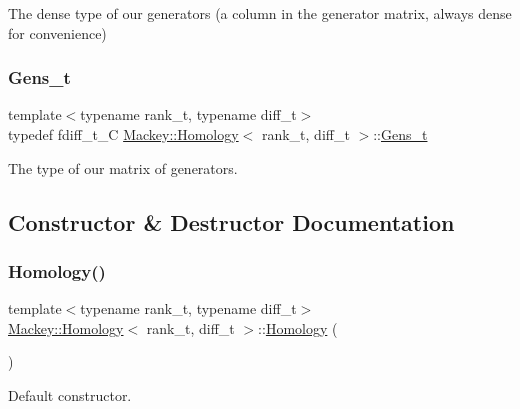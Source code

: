 The dense type of our generators (a column in the generator matrix, always dense for convenience) 

\mbox{\label{classMackey_1_1Homology_a986c3a6644aa52dc8279a26ade42fd64}} 
\subsubsection{\texorpdfstring{Gens\+\_\+t}{Gens\_t}}
{\footnotesize\ttfamily template$<$typename rank\+\_\+t, typename diff\+\_\+t$>$ \\
typedef fdiff\+\_\+t\+\_\+C \hyperlink{classMackey_1_1Homology}{Mackey\+::\+Homology}$<$ rank\+\_\+t, diff\+\_\+t $>$\+::\hyperlink{classMackey_1_1Homology_a986c3a6644aa52dc8279a26ade42fd64}{Gens\+\_\+t}}



The type of our matrix of generators. 



\subsection{Constructor \& Destructor Documentation}
\mbox{\label{classMackey_1_1Homology_a3580b194f986bd59a02fb84db97e00f2}} 
\subsubsection{\texorpdfstring{Homology()}{Homology()}\hspace{0.1cm}{\footnotesize\ttfamily [1/3]}}
{\footnotesize\ttfamily template$<$typename rank\+\_\+t, typename diff\+\_\+t$>$ \\
\hyperlink{classMackey_1_1Homology}{Mackey\+::\+Homology}$<$ rank\+\_\+t, diff\+\_\+t $>$\+::\hyperlink{classMackey_1_1Homology}{Homology} (\begin{DoxyParamCaption}{ }\end{DoxyParamCaption})\hspace{0.3cm}{\ttfamily [inline]}}



Default constructor. 

